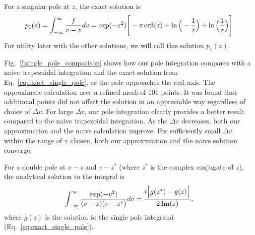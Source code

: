 For a singular pole at $z$, the exact solution is
\begin{equation}
	p_1(z) = \int_{-\infty}^\infty \frac{f}{v-z} dv = 
	\exp(-z^2) \Bigg[ -\pi \operatorname{erfi}(z) + \ln \Big(-\frac{1}{z}\Big) + \ln\Big(\frac{1}{z}\Big)\Bigg]\\
	\label{eq:exact_single_pole}
\end{equation}
For utility later with the other solutions, we will call this solution $p_1(z)$.


Fig.~\ref{f:single_pole_comparison} shows how our pole integration compares with 
a naive trapezoidal integration and the exact solution from Eq.~\ref{eq:exact_single_pole},
as the pole approaches the real axis.
The approximate calculation uses a refined mesh of 101 points. 
It was found that additional points did not affect the solution in an appreciable way regardless of choice of $\Delta v$.
For large $\Delta v$, our pole integration clearly provides a better result
compared to the naive trapezoidal integration. 
As the $\Delta v$ decreases, both our approximation and the naive calculation improve.
For sufficiently small $\Delta v$, within the range of $\gamma$ chosen, both our
approximation and the naive solution converge.


For a double pole at $v - z$ and $v-z^*$ (where $z^*$ is the complex conjugate of $z$), the analytical solution to the integral is
\begin{equation}
	\int_{-\infty}^\infty \frac{\exp (-v^2)}{(v-z)(v-z^*)} dv = 
	\frac{i \Big[ g(z^*) - g(z)  \Big]}{2 \operatorname{Im}(z)},
	\label{eq:exact_double_pole}
\end{equation}
where $g(z)$ is the solution to the single pole integrand (Eq.~\ref{eq:exact_single_pole}).


